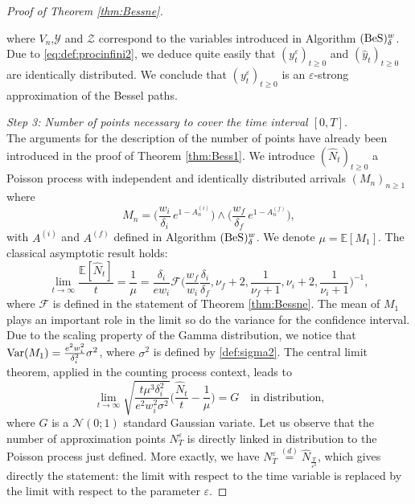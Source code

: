 \documentclass[12pt]{article}
\newcommand{\ai}{A^{(i)}}
\newcommand{\af}{A^{(f)}}
\numberwithin{equation}{section}
\begin{document}
\begin{proof}[Proof of Theorem \ref{thm:Bessne}]
\begin{itemize}
\[\]
where $V_n$,$\mathcal{Y}$ and $\mathcal{Z}$ correspond to the variables introduced in Algorithm $({\rm BeS})_{\delta}^w$. Due to \eqref{eq:def:procinfini2}, we deduce quite easily that $(y_t^\varepsilon)_{t\ge 0}$ and $(\widehat{y}_t)_{t\ge 0}$ are identically distributed. We conclude that $(y_t^\varepsilon)_{t\ge 0}$ is an $\varepsilon$-strong approximation of the Bessel paths.
\end{itemize}
%
%
%
%
\noindent \emph{Step 3: Number of points necessary to cover the time interval $[0,T]$.}\\[5pt]
The arguments for the description of the number of points have already been introduced in the proof of Theorem \ref{thm:Bess1}. We introduce $(\widehat{N}_t)_{t\ge 0}$ a Poisson process with independent and identically distributed arrivals $(M_n)_{n\ge 1}$ where 
\[
M_n=\Big(\frac{ w_i}{\delta_i}\,e^{1-\ai_n}\Big)\wedge \Big(\frac{w_f}{\delta_f}\,e^{1-\af_n}\Big),
\]
with $\ai$ and $\af$ defined in Algorithm $({\rm BeS})_\delta^w$. We denote $\mu=\mathbb{E}[M_1]$. The classical asymptotic result holds:
\begin{equation}
\label{eq:limitpoiss}
\lim_{t\to \infty}\frac{\mathbb{E}[\widehat{N}_t]}{t}=\frac{1}{\mu}= \frac{\delta_i}{e w_i} \mathcal{F}\Big( \frac{w_f}{w_i}\frac{\delta_i}{\delta_f},\nu_f+2,\frac{1}{\nu_f+1},\nu_i+2,\frac{1}{\nu_i+1} \Big)^{-1},
\end{equation}
 where $\mathcal{F}$ is defined in the statement of Theorem \ref{thm:Bessne}. The mean of $M_1$ plays an important role in the limit so do the variance for the confidence interval. Due to the scaling property of the Gamma distribution, we notice that ${\rm Var}(M_1)=\frac{e^2w_i^2}{\delta_i^2}\sigma^2$, where $\sigma^2$ is defined by \eqref{def:sigma2}. The central limit theorem, applied in the counting process context, leads to 
\[
\lim_{t\to\infty}\sqrt{\frac{t\mu^3\delta_i^2}{e^2w_i^2\sigma^2}}\Big( \frac{\widehat{N}_t}{t}-\frac{1}{\mu} \Big)=G\quad \mbox{in distribution,}
\]
where $G$ is a $\mathcal{N}(0;1)$ standard Gaussian variate. Let us observe that the number of approximation points $N^\varepsilon_T$ is directly linked in distribution to the Poisson process just defined. More exactly, we have $N^\varepsilon_T\overset{(d)}{=}\widehat{N}_{\frac{T}{\varepsilon^2}}$, which gives directly the statement: the limit with respect to the time variable is replaced by the limit with respect to the parameter $\varepsilon$.
\end{proof}
\end{document}
